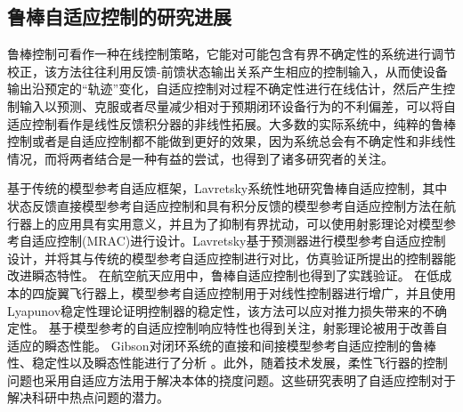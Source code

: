 \subsection{鲁棒自适应控制的研究进展  }


鲁棒控制可看作一种在线控制策略，它能对可能包含有界不确定性的系统进行调节校正，该方法往往利用反馈-前馈状态输出关系产生相应的控制输入，从而使设备输出沿预定的“轨迹”变化，自适应控制对过程不确定性进行在线估计，然后产生控制输入以预测、克服或者尽量减少相对于预期闭环设备行为的不利偏差，可以将自适应控制看作是线性反馈积分器的非线性拓展\cite{lavretsky2013robust}。大多数的实际系统中，纯粹的鲁棒控制或者是自适应控制都不能做到更好的效果，因为系统总会有不确定性和非线性情况，而将两者结合是一种有益的尝试，也得到了诸多研究者的关注。

基于传统的模型参考自适应框架，Lavretsky系统性地研究鲁棒自适应控制，其中状态反馈直接模型参考自适应控制和具有积分反馈的模型参考自适应控制方法在航行器上的应用具有实用意义，并且为了抑制有界扰动，可以使用射影理论对模型参考自适应控制(MRAC)进行设计\cite{lavretsky2013robust}。Lavretsky基于预测器进行模型参考自适应控制设计，并将其与传统的模型参考自适应控制进行对比，仿真验证所提出的控制器能改进瞬态特性\cite{lavretsky2010predictor}。 在航空航天应用中，鲁棒自适应控制也得到了实践验证\cite{gregory2010flight,hyde2011flight}。 在低成本的四旋翼飞行器上，模型参考自适应控制用于对线性控制器进行增广，并且使用Lyapunov稳定性理论证明控制器的稳定性，该方法可以应对推力损失带来的不确定性\cite{Dydek2015Adaptive}。 基于模型参考的自适应控制响应特性也得到关注，射影理论被用于改善自适应的瞬态性能\cite{gibson2012improved}。 Gibson对闭环系统的直接和间接模型参考自适应控制的鲁棒性、稳定性以及瞬态性能进行了分析\cite{gibson2012adaptive} 。此外，随着技术发展，柔性飞行器的控制问题也采用自适应方法用于解决本体的挠度问题\cite{gadient2012very}。这些研究表明了自适应控制对于解决科研中热点问题的潜力。

